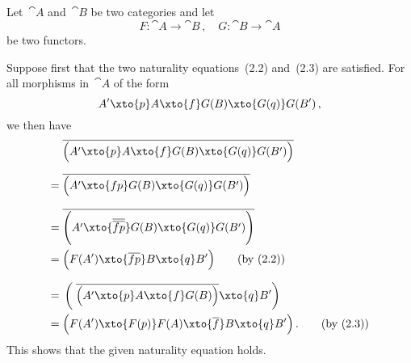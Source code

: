\subsection{}

Let~$\cat{A}$ and~$\cat{B}$ be two categories and let
\[
	F \colon \cat{A} \to \cat{B} \,,
	\quad
	G \colon \cat{B} \to \cat{A}
\]
be two functors.

Suppose first that the two naturality equations~(2.2) and~(2.3) are satisfied.
For all morphisms in~$\cat{A}$ of the form
\[
	A'
	\xto{p}
	A
	\xto{f}
	G(B)
	\xto{G(q)}
	G(B') \,,
\]
we then have
\begingroup
\allowdisplaybreaks
\begin{align*}
	{}&
	\adjtranspose{
		\Bigl(
			A'
			\xto{p}
			A
			\xto{f}
			G(B)
			\xto{G(q)}
			G(B')
		\Bigr)
	}
	\\[0.6em]
	={}&
	\adjtranspose{
		\Bigl(
			A'
			\xto{f p}
			G(B)
			\xto{G(q)}
			G(B')
		\Bigr)
	}
	\\[0.7em]
	={}&
	\adjtranspose{
		\Biggl(
			A'
			\xto{\adjtranspose{\adjtranspose{f p}}}
			G(B)
			\xto{G(q)}
			G(B')
		\Biggr)
	}
	\\
	={}&
	\Bigl(
		F(A')
		\xto{\adjtranspose{f p}}
		B
		\xto{q}
		B'
	\Bigr)
	\tag{by~(2.2)}
	\\[0.7em]
	={}&
	\left(
		\;
		\adjtranspose{
			\Bigl(
				A'
				\xto{p}
				A
				\xto{f}
				G(B)
			\Bigr)
		}
		\xto{q}
		B'
	\right)
	\\
	={}&
	\Bigl(
		F(A')
		\xto{F(p)}
		F(A)
		\xto{\adjtranspose{f}}
		B
		\xto{q}
		B'
	\Bigr) \,.
	\tag{by~(2.3)}
\end{align*}
\endgroup
This shows that the given naturality equation holds.

